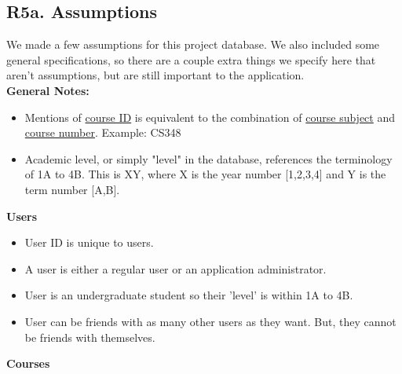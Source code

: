 \documentclass[12pt, a4paper]{article}
\begin{document}
\subsection*{R5a. Assumptions}
We made a few assumptions for this project database. We also included some general specifications, so there are a couple extra things we specify here that aren't assumptions, but are still important to the application.\\
\textbf{General Notes:} 
\begin{itemize}
    \item Mentions of \underline{course ID} is equivalent to the combination of \underline{course subject} and \underline{course number}. Example: CS348
    \item Academic level, or simply "level" in the database, references the terminology of 1A to 4B. This is XY, where X is the year number [1,2,3,4] and Y is the term number [A,B].
\end{itemize}
\textbf{Users}
\begin{itemize}
    \item User ID is unique to users.
    \item A user is either a regular user or an application administrator.
    \item User is an undergraduate student so their 'level' is within 1A to 4B.
    \item User can be friends with as many other users as they want. But, they cannot be friends with themselves.
\end{itemize}
\textbf{Courses}
\end{document}
